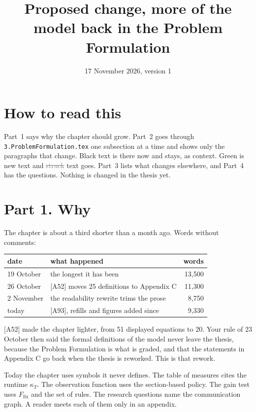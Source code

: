 \documentclass[11pt,a4paper]{article}
\title{Proposed change, more of the model back in the Problem Formulation}
\date{17 November 2026, version 1}
\newcommand{\new}[1]{\textcolor{newc}{#1}}
\newcommand{\old}[1]{\textcolor{gray}{\sout{#1}}}
\begin{document}
\sloppy
\maketitle

\section*{How to read this}
Part~1 says why the chapter should grow. Part~2 goes through
\texttt{3.ProblemFormulation.tex} one subsection at a time and shows only the
paragraphs that change. Black text is there now and stays, as context.
\new{Green} is new text and \old{struck} text goes. Part~3 lists what changes
elsewhere, and Part~4 has the questions. Nothing is changed in the thesis yet.

\section*{Part 1. Why}

The chapter is about a third shorter than a month ago. Words without comments:

\begin{center}
\begin{tabular}{llr}
  \toprule
  date & what happened & words \\
  \midrule
  19 October & the longest it has been & 13{,}500 \\
  26 October & [A52] moves 25 definitions to Appendix C & 11{,}300 \\
  2 November & the readability rewrite trims the prose & 8{,}750 \\
  today & [A93], refills and figures added since & 9{,}330 \\
  \bottomrule
\end{tabular}
\end{center}

[A52] made the chapter lighter, from 51 displayed equations to 20. Your rule
of 23 October then said the formal definitions of the model never leave the
thesis, because the Problem Formulation is what is graded, and that the
statements in Appendix C go back when the thesis is reworked. This is that
rework.

Today the chapter uses symbols it never defines. The table of measures cites
the runtime $\kappa_T$. The observation function uses the section-based
policy. The gain test uses $F_{\mathrm{fix}}$ and the set of rules. The
research questions name the communication graph. A reader meets each of them
only in an appendix.
\end{document}
